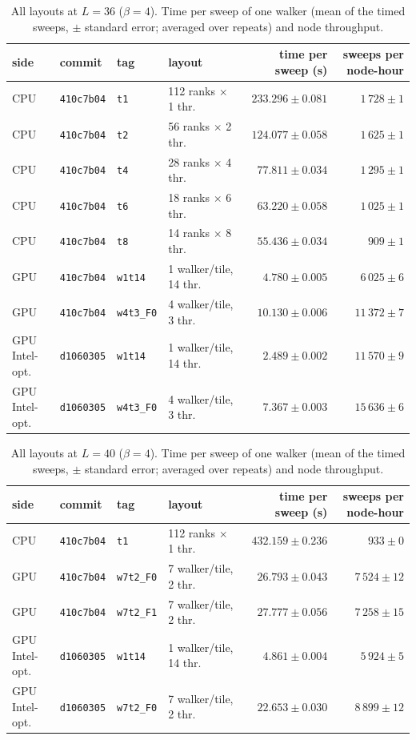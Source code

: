 \begin{table}[h]\centering\small
\caption{All layouts at $L=36$ ($\beta=4$). Time per sweep of one walker (mean of the timed sweeps, $\pm$ standard error; averaged over repeats) and node throughput.}
\begin{tabular}{@{}llllrr@{}}\toprule
side & commit & tag & layout & time per sweep (s) & sweeps per node-hour\\\midrule
CPU & \texttt{410c7b04} & \texttt{t1} & 112 ranks $\times$ 1 thr. & $233.296 \pm 0.081$ & $1\,728 \pm 1$\\
CPU & \texttt{410c7b04} & \texttt{t2} & 56 ranks $\times$ 2 thr. & $124.077 \pm 0.058$ & $1\,625 \pm 1$\\
CPU & \texttt{410c7b04} & \texttt{t4} & 28 ranks $\times$ 4 thr. & $77.811 \pm 0.034$ & $1\,295 \pm 1$\\
CPU & \texttt{410c7b04} & \texttt{t6} & 18 ranks $\times$ 6 thr. & $63.220 \pm 0.058$ & $1\,025 \pm 1$\\
CPU & \texttt{410c7b04} & \texttt{t8} & 14 ranks $\times$ 8 thr. & $55.436 \pm 0.034$ & $909 \pm 1$\\
GPU & \texttt{410c7b04} & \texttt{w1t14} & 1 walker/tile, 14 thr. & $4.780 \pm 0.005$ & $6\,025 \pm 6$\\
GPU & \texttt{410c7b04} & \texttt{w4t3\_F0} & 4 walker/tile, 3 thr. & $10.130 \pm 0.006$ & $11\,372 \pm 7$\\
GPU Intel-opt. & \texttt{d1060305} & \texttt{w1t14} & 1 walker/tile, 14 thr. & $2.489 \pm 0.002$ & $11\,570 \pm 9$\\
GPU Intel-opt. & \texttt{d1060305} & \texttt{w4t3\_F0} & 4 walker/tile, 3 thr. & $7.367 \pm 0.003$ & $15\,636 \pm 6$\\
\bottomrule\end{tabular}\end{table}
\begin{table}[h]\centering\small
\caption{All layouts at $L=40$ ($\beta=4$). Time per sweep of one walker (mean of the timed sweeps, $\pm$ standard error; averaged over repeats) and node throughput.}
\begin{tabular}{@{}llllrr@{}}\toprule
side & commit & tag & layout & time per sweep (s) & sweeps per node-hour\\\midrule
CPU & \texttt{410c7b04} & \texttt{t1} & 112 ranks $\times$ 1 thr. & $432.159 \pm 0.236$ & $933 \pm 0$\\
GPU & \texttt{410c7b04} & \texttt{w7t2\_F0} & 7 walker/tile, 2 thr. & $26.793 \pm 0.043$ & $7\,524 \pm 12$\\
GPU & \texttt{410c7b04} & \texttt{w7t2\_F1} & 7 walker/tile, 2 thr. & $27.777 \pm 0.056$ & $7\,258 \pm 15$\\
GPU Intel-opt. & \texttt{d1060305} & \texttt{w1t14} & 1 walker/tile, 14 thr. & $4.861 \pm 0.004$ & $5\,924 \pm 5$\\
GPU Intel-opt. & \texttt{d1060305} & \texttt{w7t2\_F0} & 7 walker/tile, 2 thr. & $22.653 \pm 0.030$ & $8\,899 \pm 12$\\
\bottomrule\end{tabular}\end{table}
